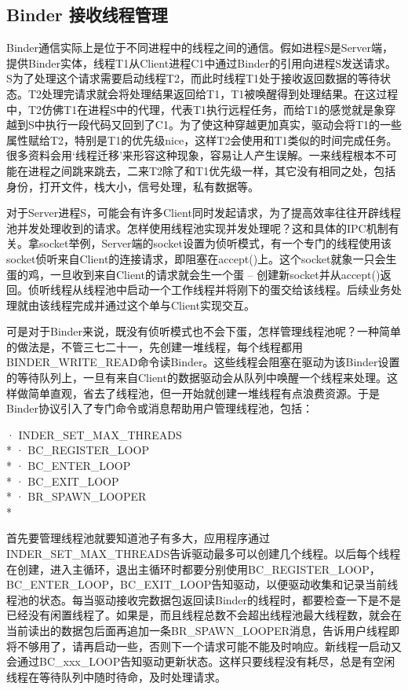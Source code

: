 \documentclass[a4paper,11pt]{article}
\begin{document}
\subsection{Binder 接收线程管理}
Binder通信实际上是位于不同进程中的线程之间的通信。假如进程S是Server端，提供Binder实体，线程T1从Client进程C1中通过Binder的引用向进程S发送请求。S为了处理这个请求需要启动线程T2，而此时线程T1处于接收返回数据的等待状态。T2处理完请求就会将处理结果返回给T1，T1被唤醒得到处理结果。在这过程中，T2仿佛T1在进程S中的代理，代表T1执行远程任务，而给T1的感觉就是象穿越到S中执行一段代码又回到了C1。为了使这种穿越更加真实，驱动会将T1的一些属性赋给T2，特别是T1的优先级nice，这样T2会使用和T1类似的时间完成任务。很多资料会用‘线程迁移’来形容这种现象，容易让人产生误解。一来线程根本不可能在进程之间跳来跳去，二来T2除了和T1优先级一样，其它没有相同之处，包括身份，打开文件，栈大小，信号处理，私有数据等。

对于Server进程S，可能会有许多Client同时发起请求，为了提高效率往往开辟线程池并发处理收到的请求。怎样使用线程池实现并发处理呢？这和具体的IPC机制有关。拿socket举例，Server端的socket设置为侦听模式，有一个专门的线程使用该socket侦听来自Client的连接请求，即阻塞在accept()上。这个socket就象一只会生蛋的鸡，一旦收到来自Client的请求就会生一个蛋 – 创建新socket并从accept()返回。侦听线程从线程池中启动一个工作线程并将刚下的蛋交给该线程。后续业务处理就由该线程完成并通过这个单与Client实现交互。

可是对于Binder来说，既没有侦听模式也不会下蛋，怎样管理线程池呢？一种简单的做法是，不管三七二十一，先创建一堆线程，每个线程都用BINDER_WRITE_READ命令读Binder。这些线程会阻塞在驱动为该Binder设置的等待队列上，一旦有来自Client的数据驱动会从队列中唤醒一个线程来处理。这样做简单直观，省去了线程池，但一开始就创建一堆线程有点浪费资源。于是Binder协议引入了专门命令或消息帮助用户管理线程池，包括：

· INDER_SET_MAX_THREADS\\* 
· BC_REGISTER_LOOP     \\*
· BC_ENTER_LOOP        \\*
· BC_EXIT_LOOP         \\*
· BR_SPAWN_LOOPER      \\*

首先要管理线程池就要知道池子有多大，应用程序通过INDER_SET_MAX_THREADS告诉驱动最多可以创建几个线程。以后每个线程在创建，进入主循环，退出主循环时都要分别使用BC_REGISTER_LOOP，BC_ENTER_LOOP，BC_EXIT_LOOP告知驱动，以便驱动收集和记录当前线程池的状态。每当驱动接收完数据包返回读Binder的线程时，都要检查一下是不是已经没有闲置线程了。如果是，而且线程总数不会超出线程池最大线程数，就会在当前读出的数据包后面再追加一条BR_SPAWN_LOOPER消息，告诉用户线程即将不够用了，请再启动一些，否则下一个请求可能不能及时响应。新线程一启动又会通过BC_xxx_LOOP告知驱动更新状态。这样只要线程没有耗尽，总是有空闲线程在等待队列中随时待命，及时处理请求。
\end{document}
